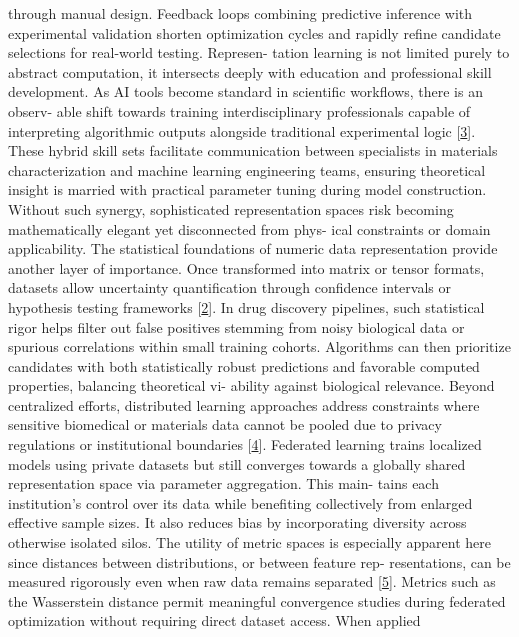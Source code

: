 \documentclass[
]{article}
\begin{document}
through manual design. Feedback loops combining predictive inference
with experimental validation shorten optimization cycles and rapidly
refine candidate selections for real-world testing. Represen- tation
learning is not limited purely to abstract computation, it intersects
deeply with education and professional skill development. As AI tools
become standard in scientific workflows, there is an observ- able shift
towards training interdisciplinary professionals capable of interpreting
algorithmic outputs alongside traditional experimental logic
{[}\hyperref[_bookmark43]{3}{]}. These hybrid skill sets facilitate
communication between specialists in materials characterization and
machine learning engineering teams, ensuring theoretical insight is
married with practical parameter tuning during model construction.
Without such synergy, sophisticated representation spaces risk becoming
mathematically elegant yet disconnected from phys- ical constraints or
domain applicability. The statistical foundations of numeric data
representation provide another layer of importance. Once transformed
into matrix or tensor formats, datasets allow uncertainty quantification
through confidence intervals or hypothesis testing frameworks
{[}\hyperref[_bookmark42]{2}{]}. In drug discovery pipelines, such
statistical rigor helps filter out false positives stemming from noisy
biological data or spurious correlations within small training cohorts.
Algorithms can then prioritize candidates with both statistically robust
predictions and favorable computed properties, balancing theoretical vi-
ability against biological relevance. Beyond centralized efforts,
distributed learning approaches address constraints where sensitive
biomedical or materials data cannot be pooled due to privacy regulations
or institutional boundaries {[}\hyperref[_bookmark44]{4}{]}. Federated
learning trains localized models using private datasets but still
converges towards a globally shared representation space via parameter
aggregation. This main- tains each institution's control over its data
while benefiting collectively from enlarged effective sample sizes. It
also reduces bias by incorporating diversity across otherwise isolated
silos. The utility of metric spaces is especially apparent here since
distances between distributions, or between feature rep- resentations,
can be measured rigorously even when raw data remains separated
{[}\hyperref[_bookmark45]{5}{]}. Metrics such as the Wasserstein
distance permit meaningful convergence studies during federated
optimization without requiring direct dataset access. When applied
\end{document}
